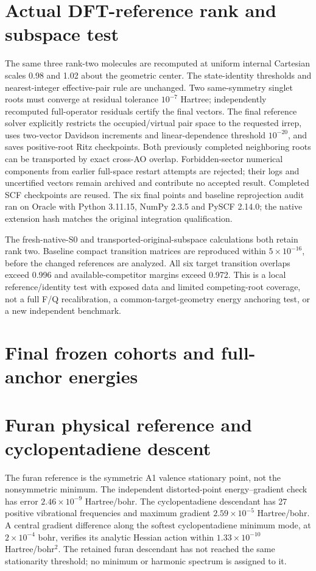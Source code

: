 \documentclass[11pt,a4paper]{article}
\begin{document}
\section{Actual DFT-reference rank and subspace test}
The same three rank-two molecules are recomputed at uniform internal Cartesian scales 0.98 and 1.02 about the geometric center. The state-identity thresholds and nearest-integer effective-pair rule are unchanged. Two same-symmetry singlet roots must converge at residual tolerance $10^{-7}$ Hartree; independently recomputed full-operator residuals certify the final vectors. The final reference solver explicitly restricts the occupied/virtual pair space to the requested irrep, uses two-vector Davidson increments and linear-dependence threshold $10^{-20}$, and saves positive-root Ritz checkpoints. Both previously completed neighboring roots can be transported by exact cross-AO overlap. Forbidden-sector numerical components from earlier full-space restart attempts are rejected; their logs and uncertified vectors remain archived and contribute no accepted result. Completed SCF checkpoints are reused. The six final points and baseline reprojection audit ran on Oracle with Python 3.11.15, NumPy 2.3.5 and PySCF 2.14.0; the native extension hash matches the original integration qualification.

The fresh-native-S0 and transported-original-subspace calculations both retain rank two. Baseline compact transition matrices are reproduced within $5\times10^{-16}$, before the changed references are analyzed. All six target transition overlaps exceed 0.996 and available-competitor margins exceed 0.972. This is a local reference/identity test with exposed data and limited competing-root coverage, not a full F/Q recalibration, a common-target-geometry energy anchoring test, or a new independent benchmark.


\clearpage
\section{Final frozen cohorts and full-anchor energies}


\clearpage
\section{Furan physical reference and cyclopentadiene descent}


The furan reference is the symmetric A1 valence stationary point, not the nonsymmetric minimum. The independent distorted-point energy--gradient check has error $2.46\times10^{-9}$ Hartree/bohr. The cyclopentadiene descendant has 27 positive vibrational frequencies and maximum gradient $2.59\times10^{-5}$ Hartree/bohr. A central gradient difference along the softest cyclopentadiene minimum mode, at $2\times10^{-4}$ bohr, verifies its analytic Hessian action within $1.33\times10^{-10}$ Hartree/bohr$^2$. The retained furan descendant has not reached the same stationarity threshold; no minimum or harmonic spectrum is assigned to it.
\clearpage
\end{document}
